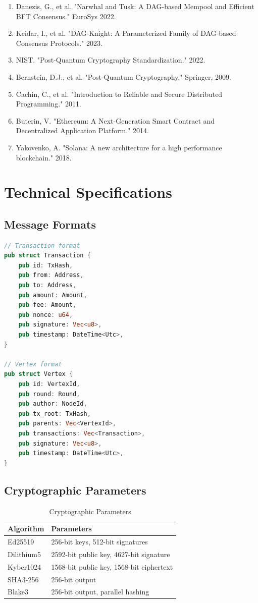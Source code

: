 \documentclass[11pt,a4paper]{article}
\begin{document}
\begin{enumerate}
    \item Danezis, G., et al. "Narwhal and Tusk: A DAG-based Mempool and Efficient BFT Consensus." EuroSys 2022.
    \item Keidar, I., et al. "DAG-Knight: A Parameterized Family of DAG-based Consensus Protocols." 2023.
    \item NIST. "Post-Quantum Cryptography Standardization." 2022.
    \item Bernstein, D.J., et al. "Post-Quantum Cryptography." Springer, 2009.
    \item Cachin, C., et al. "Introduction to Reliable and Secure Distributed Programming." 2011.
    \item Buterin, V. "Ethereum: A Next-Generation Smart Contract and Decentralized Application Platform." 2014.
    \item Yakovenko, A. "Solana: A new architecture for a high performance blockchain." 2018.
\end{enumerate}

\appendix

\section{Technical Specifications}

\subsection{Message Formats}

\begin{lstlisting}[language=Rust]
// Transaction format
pub struct Transaction {
    pub id: TxHash,
    pub from: Address,
    pub to: Address,
    pub amount: Amount,
    pub fee: Amount,
    pub nonce: u64,
    pub signature: Vec<u8>,
    pub timestamp: DateTime<Utc>,
}

// Vertex format
pub struct Vertex {
    pub id: VertexId,
    pub round: Round,
    pub author: NodeId,
    pub tx_root: TxHash,
    pub parents: Vec<VertexId>,
    pub transactions: Vec<Transaction>,
    pub signature: Vec<u8>,
    pub timestamp: DateTime<Utc>,
}
\end{lstlisting}

\subsection{Cryptographic Parameters}

\begin{table}[h]
\centering
\begin{tabular}{|l|l|}
\hline
\textbf{Algorithm} & \textbf{Parameters} \\
\hline
Ed25519 & 256-bit keys, 512-bit signatures \\
Dilithium5 & 2592-bit public key, 4627-bit signature \\
Kyber1024 & 1568-bit public key, 1568-bit ciphertext \\
SHA3-256 & 256-bit output \\
Blake3 & 256-bit output, parallel hashing \\
\hline
\end{tabular}
\caption{Cryptographic Parameters}
\end{table}
\end{document}
